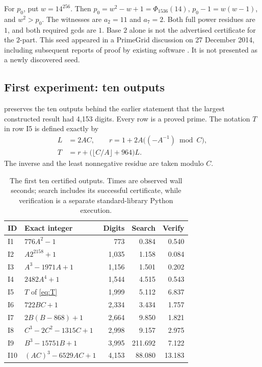 \documentclass[11pt,a4paper]{article}
\theoremstyle{definition}\newtheorem{definition}[theorem]{Definition}
\theoremstyle{remark}\newtheorem{remark}[theorem]{Remark}
\begin{document}
For $p_0$, put $w=14^{256}$. Then $p_0=w^2-w+1=\Phi_{1536}(14)$,
$p_0-1=w(w-1)$, and $w^2>p_0$. The witnesses are $a_2=11$ and $a_7=2$.
Both full power residues are $1$, and both required gcds are $1$. Base $2$
alone is not the advertised certificate for the $2$-part. This seed appeared
in a PrimeGrid discussion on 27 December 2014, including subsequent reports
of proof by existing software \cite{primegrid}. It is not presented as a newly
discovered seed.

\subsection{First experiment: ten outputs}
\label{sec:first}

 preserves the ten outputs behind the earlier statement that
the largest constructed result had 4,153 digits. Every row is a proved prime.
The notation $T$ in row I5 is defined exactly by
\begin{equation}\label{eq:T}
 \begin{split}
 L&=2AC,\qquad r=1+2A\bigl((-A^{-1})\bmod C\bigr),\\
 T&=r+\bigl(\lfloor C/A\rfloor+964\bigr)L.
 \end{split}
\end{equation}
The inverse and the least nonnegative residue are taken modulo $C$.

\begin{table}[htbp]
\centering\small
\caption{The first ten certified outputs. Times are observed wall seconds;
search includes its successful certificate, while verification is a separate
standard-library Python execution.}\label{tab:first}
\begin{tabularx}{\linewidth}{@{}lXrrr@{}}
\toprule
ID & Exact integer & Digits & Search & Verify\\
\midrule
I1 & $776A^2-1$ & 773 & 0.384 & 0.540\\
I2 & $A2^{2158}+1$ & 1,035 & 1.158 & 0.084\\
I3 & $A^3-1971A+1$ & 1,156 & 1.501 & 0.202\\
I4 & $2482A^4+1$ & 1,544 & 4.515 & 0.543\\
I5 & $T$ of \eqref{eq:T} & 1,999 & 5.112 & 6.837\\
I6 & $722BC+1$ & 2,334 & 3.434 & 1.757\\
I7 & $2B(B-868)+1$ & 2,664 & 9.850 & 1.821\\
I8 & $C^3-2C^2-1315C+1$ & 2,998 & 9.157 & 2.975\\
I9 & $B^3-15751B+1$ & 3,995 & 211.692 & 7.122\\
I10 & $(AC)^3-6529AC+1$ & 4,153 & 88.080 & 13.183\\
\bottomrule
\end{tabularx}
\end{table}
\end{document}
